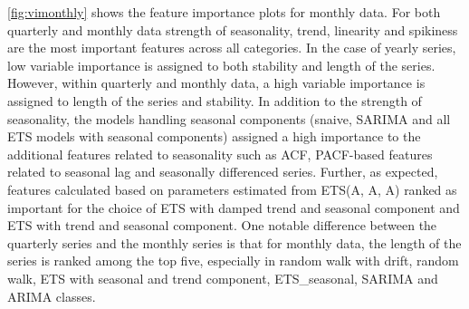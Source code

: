 \documentclass[11pt,a4paper,]{article}
\begin{document}
\autoref{fig:vimonthly} shows the feature importance plots for monthly data. For both quarterly and monthly data strength of seasonality, trend, linearity and spikiness are the most important features across all categories. In the case of yearly series, low variable importance is assigned to both stability and length of the series. However, within quarterly and monthly data, a high variable importance is assigned to length of the series and stability. In addition to the strength of seasonality, the models handling seasonal components (snaive, SARIMA and all ETS models with seasonal components) assigned a high importance to the additional features related to seasonality such as ACF, PACF-based features related to seasonal lag and seasonally differenced series. Further, as expected, features calculated based on parameters estimated from ETS(A, A, A) ranked as important for the choice of ETS with damped trend and seasonal component and ETS with trend and seasonal component. One notable difference between the quarterly series and the monthly series is that for monthly data, the length of the series is ranked among the top five, especially in random walk with drift, random walk, ETS with seasonal and trend component, ETS\_seasonal, SARIMA and ARIMA classes.
\end{document}
